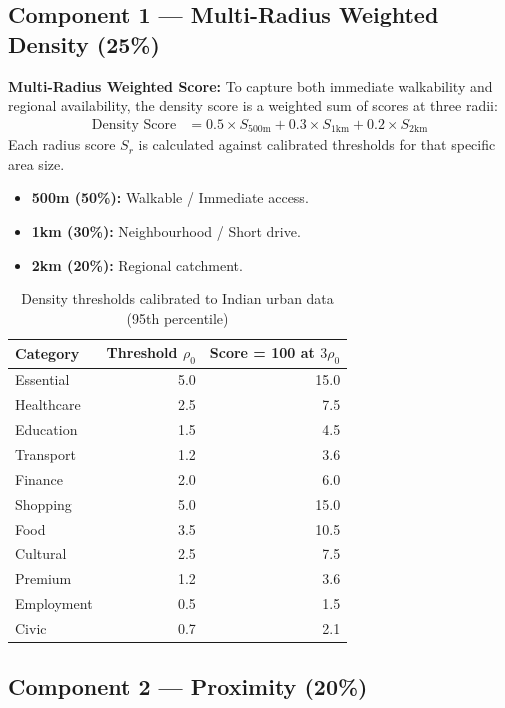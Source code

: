 \documentclass[11pt,a4paper]{article}
\begin{document}
\subsection{Component 1 --- Multi-Radius Weighted Density (25\%)}

\textbf{Multi-Radius Weighted Score:}
To capture both immediate walkability and regional availability, the density score is a weighted sum of scores at three radii:
\begin{align}
\text{Density Score} &= 0.5 \times S_{500\text{m}} + 0.3 \times S_{1\text{km}} + 0.2 \times S_{2\text{km}}
\end{align}
Each radius score $S_r$ is calculated against calibrated thresholds for that specific area size.
\begin{itemize}
    \item \textbf{500m (50\%):} Walkable / Immediate access.
    \item \textbf{1km (30\%):} Neighbourhood / Short drive.
    \item \textbf{2km (20\%):} Regional catchment.
\end{itemize}

\begin{table}[H]
\centering
\caption{Density thresholds calibrated to Indian urban data (95th percentile)}
\begin{tabular}{@{}lrr@{}}
\toprule
\textbf{Category} & \textbf{Threshold $\rho_0$} & \textbf{Score = 100 at $3\rho_0$} \\ \midrule
Essential   & 5.0 & 15.0 \\
Healthcare  & 2.5 & 7.5  \\
Education   & 1.5 & 4.5  \\
Transport   & 1.2 & 3.6  \\
Finance     & 2.0 & 6.0  \\
Shopping    & 5.0 & 15.0 \\
Food        & 3.5 & 10.5 \\
Cultural    & 2.5 & 7.5  \\
Premium     & 1.2 & 3.6  \\
Employment  & 0.5 & 1.5  \\
Civic       & 0.7 & 2.1  \\ \bottomrule
\end{tabular}
\end{table}

\subsection{Component 2 --- Proximity (20\%)}
\end{document}
